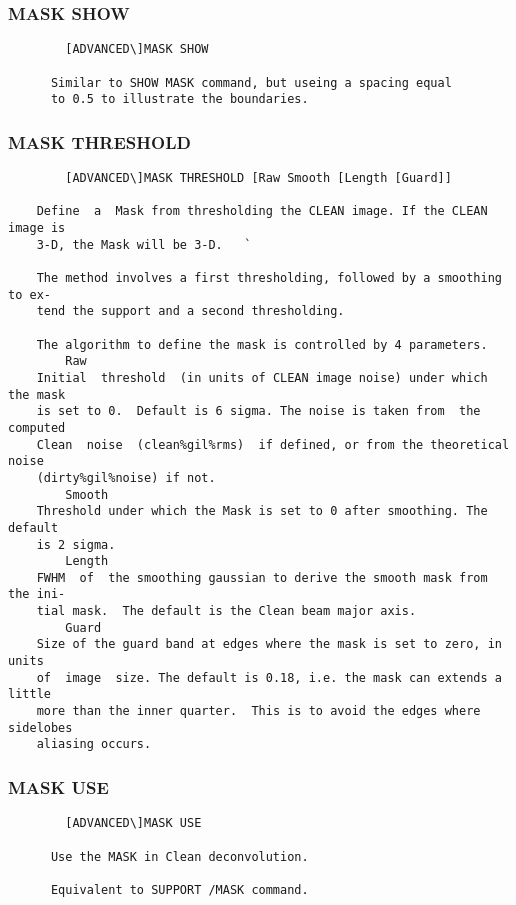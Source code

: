 \subsubsection{MASK SHOW}
\begin{verbatim}
        [ADVANCED\]MASK SHOW

      Similar to SHOW MASK command, but useing a spacing equal
      to 0.5 to illustrate the boundaries.

\end{verbatim}
\subsubsection{MASK THRESHOLD}
\begin{verbatim}
        [ADVANCED\]MASK THRESHOLD [Raw Smooth [Length [Guard]]

    Define  a  Mask from thresholding the CLEAN image. If the CLEAN image is
    3-D, the Mask will be 3-D.   `

    The method involves a first thresholding, followed by a smoothing to ex-
    tend the support and a second thresholding.

    The algorithm to define the mask is controlled by 4 parameters.
        Raw
    Initial  threshold  (in units of CLEAN image noise) under which the mask
    is set to 0.  Default is 6 sigma. The noise is taken from  the  computed
    Clean  noise  (clean%gil%rms)  if defined, or from the theoretical noise
    (dirty%gil%noise) if not.
        Smooth
    Threshold under which the Mask is set to 0 after smoothing. The  default
    is 2 sigma.
        Length
    FWHM  of  the smoothing gaussian to derive the smooth mask from the ini-
    tial mask.  The default is the Clean beam major axis.
        Guard
    Size of the guard band at edges where the mask is set to zero, in  units
    of  image  size. The default is 0.18, i.e. the mask can extends a little
    more than the inner quarter.  This is to avoid the edges where sidelobes
    aliasing occurs.

\end{verbatim}
\subsubsection{MASK USE}
\begin{verbatim}
        [ADVANCED\]MASK USE

      Use the MASK in Clean deconvolution.

      Equivalent to SUPPORT /MASK command.

\end{verbatim}
